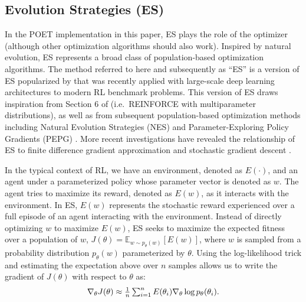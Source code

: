 \documentclass{article}
\newcommand{\jc}[1]{\comments{\textcolor{deepForestGreen}{[JC: #1]}}}
\newcommand{\comments}[1]{#1}
\begin{document}
\subsection{Evolution Strategies (ES)} \label{evolution strategies details}%
In the POET implementation in this paper, ES plays the role of the optimizer (although other optimization algorithms should also work).  Inspired by natural evolution, ES \cite{rechenberg1978evolutionsstrategien} represents a broad class of population-based optimization algorithms. The method referred to here and subsequently as ``ES'' is a version of ES popularized by \citet{es} that was recently applied with large-scale deep learning architectures to modern RL benchmark problems. This version of ES draws inspiration from Section 6 of \citet{williams1992simple} (i.e.\ REINFORCE with multiparameter distributions), as well as from subsequent population-based optimization methods including Natural Evolution Strategies (NES) \cite{wierstra2008natural} and Parameter-Exploring Policy Gradients (PEPG) \cite{sehnke2010parameter}. More recent investigations have revealed the relationship of ES to finite difference gradient approximation \cite{lehman:gecco18esfd} and stochastic gradient descent \cite{zhang:arxiv17}. 

In the typical context of RL, we have an environment, denoted as $E(\cdot)$, and an agent under a parameterized policy whose parameter vector is denoted as $w$. The agent tries to maximize its reward, denoted as $E(w)$, as it interacts with the environment. In ES, $E(w)$ represents the stochastic reward experienced over a full episode of an agent interacting with the environment. Instead of directly optimizing $w$ to maximize $E(w)$, ES seeks to maximize the expected fitness over a population of $w$, $J(\theta) = \mathbb{E}_{w \sim p_{\theta}(w)}[E(w)]$, where $w$ is sampled from a probability distribution $p_{\theta}(w)$ parameterized by $\theta$. 
Using  the log-likelihood trick \cite{williams1992simple} and estimating the expectation above over $n$ samples allows us to write the gradient of $J(\theta)$ with respect to $\theta$ as:
\begin{gather*}\label{eq:1}
\scalebox{1.}{$
\nabla_{\theta}J(\theta) \approx \frac{1}{n}\sum_{i=1}^{n}E(\theta_{i})\nabla_{\theta} \log p_{\theta}(\theta_{i}).
$}
\end{gather*}
\end{document}
